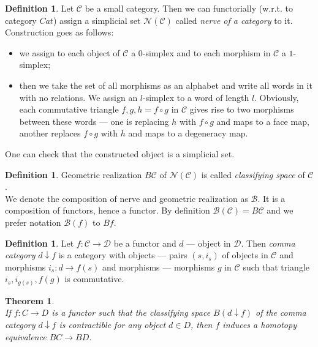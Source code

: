 \documentclass[a4paper, 12pt]{article}
\newcounter{stmcounter}[section]
\newcounter{thcounter}
\numberwithin{equation}{section}
\newtheorem{theorem}[thcounter]{Theorem}
\theoremstyle{definition}
\newtheorem{definition}[stmcounter]{Definition}
\theoremstyle{remark}
\newcommand{\define}[1]{{\textit{#1}}}
\begin{document}
\begin{definition}
  Let $\mathcal{C}$ be a small category. Then we can functorially (w.r.t. to category $Cat$) assign a simplicial set $\mathcal{N}(\mathcal{C})$ called \define{nerve of a category} to it.\\

  Construction goes as follows:
  \begin{itemize}
    \item we assign to each object of $\mathcal{C}$ a $0$-simplex and to each morphism in $\mathcal{C}$ a $1$-simplex;
    \item then we take the set of all morphisms as an alphabet and write all words in it with no relations. We assign an $l$-simplex to a word of length $l$. Obviously, each commutative triangle $f, g, h = f \circ g$ in $\mathcal{C}$ gives rise to two morphisms between these words --- one is replacing $h$ with $f \circ g$ and maps to a face map, another replaces $f \circ g$ with $h$ and maps to a degeneracy map.
  \end{itemize}

   One can check that the constructed object is a simplicial set.
\end{definition}

\begin{definition}
  Geometric realization $B\mathcal{C}$ of $\mathcal{N}(\mathcal{C})$ is called \define{classifying space} of $\mathcal{C}$.\\

  We denote the composition of nerve and geometric realization as $\mathcal{B}$. It is a composition of functors, hence a functor. By definition $\mathcal{B}(\mathcal{C}) = B\mathcal{C}$ and we prefer notation $\mathcal{B}(f)$ to $Bf$.
\end{definition}

\begin{definition}
  Let $f: \mathcal{C} \to \mathcal{D}$ be a functor and $d$ --- object in $\mathcal{D}$. Then \define{comma category} $d \downarrow f$ is a category with objects --- pairs $(s,i_s)$ of objects in $\mathcal{C}$ and morphisms $i_s : d \to f(s)$ and morphisms --- morphisms $g$ in $\mathcal{C}$ such that triangle $i_s, i_{g(s)}, f(g)$ is commutative.
\end{definition}

\begin{theorem} {\cite[Theorem A]{Quillen72}}\\
  If $f: C \to D$ is a functor such that the classifying space $B(d \downarrow f)$ of the comma category $d \downarrow f$ is contractible for any object $d \in D$, then $f$ induces a homotopy equivalence $BC \to BD$.
\end{theorem}
\end{document}
